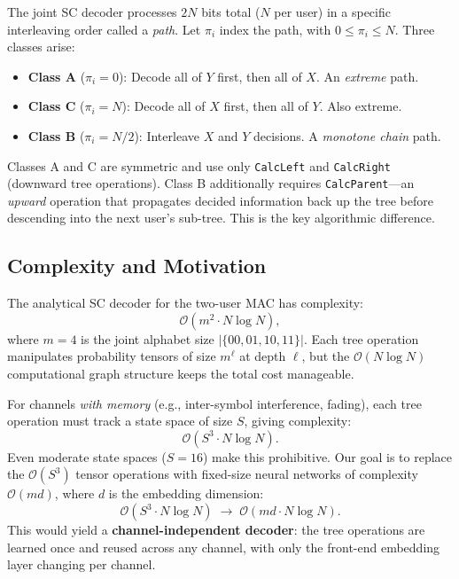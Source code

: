 \documentclass[10pt]{article}
\begin{document}
The joint SC decoder processes $2N$ bits total ($N$ per user) in a specific interleaving order called a \emph{path}. Let $\pi_i$ index the path, with $0 \le \pi_i \le N$. Three classes arise:

\begin{itemize}[nosep]
    \item \textbf{Class A} ($\pi_i = 0$): Decode all of $Y$ first, then all of $X$. An \emph{extreme} path.
    \item \textbf{Class C} ($\pi_i = N$): Decode all of $X$ first, then all of $Y$. Also extreme.
    \item \textbf{Class B} ($\pi_i = N/2$): Interleave $X$ and $Y$ decisions. A \emph{monotone chain} path.
\end{itemize}

Classes A and C are symmetric and use only \texttt{CalcLeft} and \texttt{CalcRight} (downward tree operations). Class B additionally requires \texttt{CalcParent}---an \emph{upward} operation that propagates decided information back up the tree before descending into the next user's sub-tree. This is the key algorithmic difference.

\subsection{Complexity and Motivation}

The analytical SC decoder for the two-user MAC has complexity:
\begin{equation}
\mathcal{O}(m^2 \cdot N \log N),
\end{equation}
where $m = 4$ is the joint alphabet size $|\{00, 01, 10, 11\}|$. Each tree operation manipulates probability tensors of size $m^{\ell}$ at depth $\ell$, but the $\mathcal{O}(N \log N)$ computational graph structure keeps the total cost manageable.

For channels \emph{with memory} (e.g., inter-symbol interference, fading), each tree operation must track a state space of size $S$, giving complexity:
\begin{equation}
\mathcal{O}(S^3 \cdot N \log N).
\end{equation}
Even moderate state spaces ($S = 16$) make this prohibitive. Our goal is to replace the $\mathcal{O}(S^3)$ tensor operations with fixed-size neural networks of complexity $\mathcal{O}(md)$, where $d$ is the embedding dimension:
\begin{equation}
\mathcal{O}(S^3 \cdot N \log N) \;\longrightarrow\; \mathcal{O}(md \cdot N \log N).
\end{equation}
This would yield a \textbf{channel-independent decoder}: the tree operations are learned once and reused across any channel, with only the front-end embedding layer changing per channel.
\end{document}
